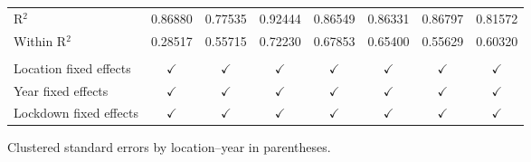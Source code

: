 \begin{tabular}{lccccccc}
   R$^2$                             & 0.86880       & 0.77535       & 0.92444         & 0.86549         & 0.86331                & 0.86797       & 0.81572\\  
   Within R$^2$                      & 0.28517       & 0.55715       & 0.72230         & 0.67853         & 0.65400                & 0.55629       & 0.60320\\  
    \\
   Location fixed effects            & $\checkmark$  & $\checkmark$  & $\checkmark$    & $\checkmark$    & $\checkmark$           & $\checkmark$  & $\checkmark$\\   
   Year fixed effects                & $\checkmark$  & $\checkmark$  & $\checkmark$    & $\checkmark$    & $\checkmark$           & $\checkmark$  & $\checkmark$\\   
   Lockdown fixed effects            & $\checkmark$  & $\checkmark$  & $\checkmark$    & $\checkmark$    & $\checkmark$           & $\checkmark$  & $\checkmark$\\   
   \bottomrule
\end{tabular}
 
\par \raggedright 
Clustered standard errors by location--year in parentheses.
\par\endgroup


